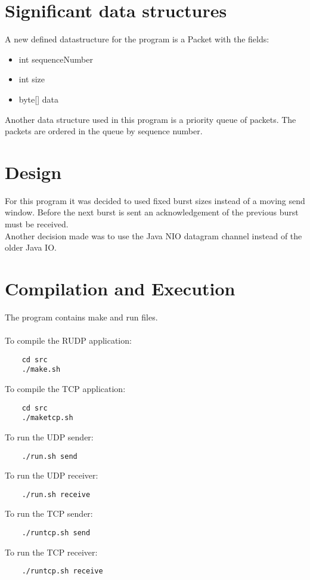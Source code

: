 \documentclass[a4paper,10pt]{article}
\begin{document}
\section{Significant data structures}
A new defined datastructure for the program is a Packet with the fields:
\begin{itemize}
	\item int sequenceNumber
	\item int size
	\item byte[] data
\end{itemize}
Another data structure used in this program is a priority queue of
packets. The packets are ordered in the queue by sequence number.

\section{Design}
For this program it was decided to used fixed burst sizes instead of a moving
send window. Before the next burst is sent an acknowledgement of the previous
burst must be received.\\
Another decision made was to use the Java NIO datagram channel instead of
the older Java IO.

\section{Compilation and Execution}
The program contains make and run files.\\\\
To compile the RUDP application:
\begin{verbatim}
	cd src
	./make.sh
\end{verbatim}
To compile the TCP application:
\begin{verbatim}
	cd src
	./maketcp.sh
\end{verbatim}
To run the UDP sender:
\begin{verbatim}
	./run.sh send
\end{verbatim}
To run the UDP receiver:
\begin{verbatim}
	./run.sh receive
\end{verbatim}
To run the TCP sender:
\begin{verbatim}
	./runtcp.sh send
\end{verbatim}
To run the TCP receiver:
\begin{verbatim}
	./runtcp.sh receive
\end{verbatim}
\end{document}
